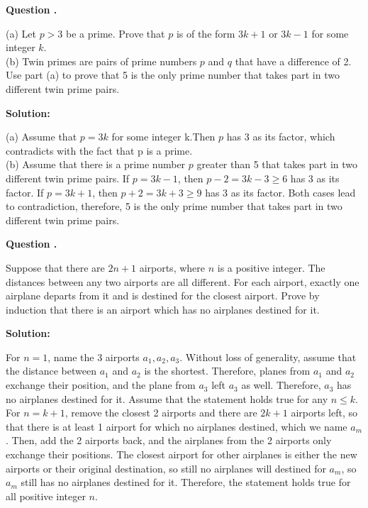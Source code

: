 \documentclass[12pt]{article}
\newcounter{questionnumber}
\newenvironment{question}[1][]{\stepcounter{questionnumber}\par\noindent\textbf{Question \thequestionnumber. #1}\par}{\par}
\newenvironment{solution}{\par\noindent\textbf{Solution:}\par}{\par\vspace{1em}}
\begin{document}
\begin{question}
    \noindent
    (a) Let $p > 3$ be a prime. Prove that $p$ is of the form $3k + 1$ or $3k - 1$ for some integer $k$.\\
    (b) Twin primes are pairs of prime numbers $p$ and $q$ that have a difference of 2. Use part (a) to prove that 5 is the only prime number that takes part in two different twin prime pairs.
\end{question}
\begin{solution}
    \noindent
    (a) Assume that $p=3k$ for some integer k.Then $p$ has 3 as its factor, which contradicts with the fact that p is a prime.\\
    (b) Assume that there is a prime number $p$ greater than 5 that takes part in two different twin prime pairs.
    If $p=3k-1$, then $p-2=3k-3\geq 6$ has 3 as its factor. If $p=3k+1$, then $p+2=3k+3\geq 9$ has 3 as its factor.
    Both cases lead to contradiction, therefore, 5 is the only prime number that takes part in two different twin prime pairs.
\end{solution}
\begin{question}
    Suppose that there are $2n+1$ airports, where $n$ is a positive integer. The distances between any two airports are all different. For each airport, exactly one airplane departs from it and is destined for the closest airport. Prove by induction that there is an airport which has no airplanes destined for it.
\end{question}
\begin{solution}
    For $n=1$, name the 3 airports $a_1, a_2, a_3$. Without loss of generality, assume that the distance between $a_1$ and $a_2$ is the shortest.
    Therefore, planes from $a_1$ and $a_2$ exchange their position, and the plane from $a_3$ left $a_3$ as well. Therefore, $a_3$ has no airplanes destined for it.
    Assume that the statement holds true for any $n\leq k$. For $n=k+1$, remove the closest 2 airports and there are $2k+1$ airports left, so that there is at least 1 airport for which no airplanes destined, which we name $a_m$.
    Then, add the 2 airports back, and the airplanes from the 2 airports only exchange their positions.
    The closest airport for other airplanes is either the new airports or their original destination, so still no airplanes will destined for $a_m$, so $a_m$ still has no airplanes destined for it.
    Therefore, the statement holds true for all positive integer $n$.
\end{solution}
\end{document}

